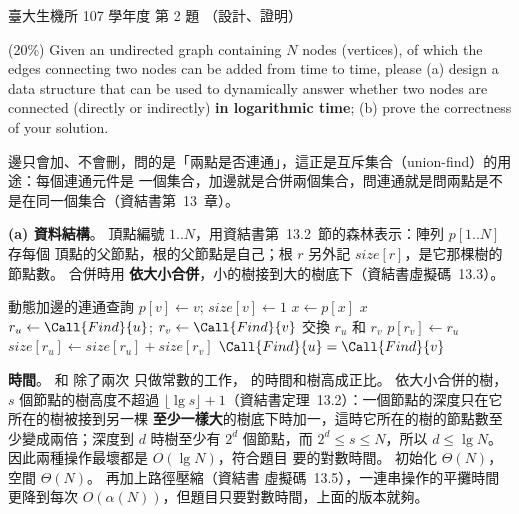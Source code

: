 \begin{pastexam}[label={px:ntu-107-bime-ds-02}]{臺大生機所 107 學年度 第 2 題}
（設計、證明）

(20\%) Given an undirected graph containing $N$ nodes (vertices), of which the edges connecting
two nodes can be added from time to time, please (a) design a data structure that can be used to
dynamically answer whether two nodes are connected (directly or indirectly) \textbf{in logarithmic
time}; (b) prove the correctness of your solution.
\end{pastexam}

\begin{pastsoln}
邊只會加、不會刪，問的是「兩點是否連通」，這正是互斥集合（union-find）的用途：每個連通元件是
一個集合，加邊就是合併兩個集合，問連通就是問兩點是不是在同一個集合（資結書第~13~章）。

\textbf{(a) 資料結構}。 頂點編號 $1..N$，用資結書第~13.2~節的森林表示：陣列 $p[1..N]$ 存每個
頂點的父節點，根的父節點是自己；根 $r$ 另外記 $\mathit{size}[r]$，是它那棵樹的節點數。 合併時用
\textbf{依大小合併}，小的樹接到大的樹底下（資結書虛擬碼~13.3）。

\begin{pseudo}{動態加邊的連通查詢}
        \State $p[v] \gets v$; $\mathit{size}[v] \gets 1$ 
    \EndFor
\EndProcedure
\Statex
{}
        \State $x \gets p[x]$
    \EndWhile
    \State \Return $x$
\EndFunction
\Statex
{}
    \State $r_u \gets \Call{Find}{u}$; $r_v \gets \Call{Find}{v}$
        \State \Return {}
    \EndIf
        \State 交換 $r_u$ 和 $r_v$ 
    \EndIf
    \State $p[r_v] \gets r_u$
    \State $\mathit{size}[r_u] \gets \mathit{size}[r_u] + \mathit{size}[r_v]$
\EndProcedure
\Statex
{}
    \State \Return $\Call{Find}{u} = \Call{Find}{v}$
\EndFunction
\end{pseudo}

\textbf{時間}。  和  除了兩次  只做常數的工作，
 的時間和樹高成正比。 依大小合併的樹，$s$ 個節點的樹高度不超過
$\lfloor \lg s \rfloor + 1$（資結書定理~13.2）：一個節點的深度只在它所在的樹被接到另一棵
\textbf{至少一樣大}的樹底下時加一，這時它所在的樹的節點數至少變成兩倍；深度到 $d$ 時樹至少有
$2^d$ 個節點，而 $2^d \le s \le N$，所以 $d \le \lg N$。 因此兩種操作最壞都是 $O(\lg N)$，符合題目
要的對數時間。 初始化 $\Theta(N)$，空間 $\Theta(N)$。  再加上路徑壓縮（資結書
虛擬碼~13.5），一連串操作的平攤時間更降到每次 $O(\alpha(N))$，但題目只要對數時間，上面的版本就夠。


\end{pastsoln}
